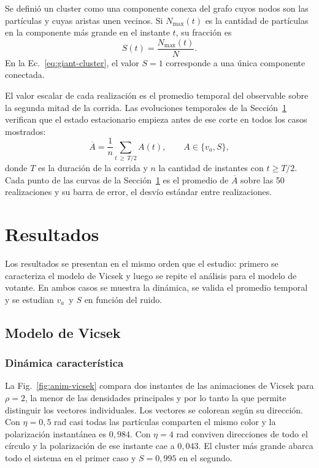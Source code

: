 \documentclass[11pt,a4paper]{article}
\newcommand{\va}{\ensuremath{v_{a}}}
\begin{document}
Se definió un cluster como una componente conexa del grafo cuyos nodos son las
partículas y cuyas aristas unen vecinos. Si $N_{\max}(t)$ es la cantidad de
partículas en la componente más grande en el instante $t$, su fracción es
\begin{equation}
    S(t) = \frac{N_{\max}(t)}{N}.
    \label{eq:giant-cluster}
\end{equation}
En la Ec.~\eqref{eq:giant-cluster}, el valor $S=1$ corresponde a una única
componente conectada.

El valor escalar de cada realización es el promedio temporal del observable
sobre la segunda mitad de la corrida. Las evoluciones temporales de la
Sección~\ref{sec:resultados} verifican que el estado estacionario empieza
antes de ese corte en todos los casos mostrados:
\begin{equation}
    \overline{A} = \frac{1}{n}\sum_{t\,\geq\,T/2} A(t),
    \qquad A\in\{\va,S\},
    \label{eq:stationary-average}
\end{equation}
donde $T$ es la duración de la corrida y $n$ la cantidad de instantes con
$t\geq T/2$. Cada punto de las curvas de la Sección~\ref{sec:resultados} es
el promedio de $\overline{A}$ sobre las 50 realizaciones y su barra de error,
el desvío estándar entre realizaciones.

\section{Resultados}
\label{sec:resultados}

Los resultados se presentan en el mismo orden que el estudio: primero se
caracteriza el modelo de Vicsek y luego se repite el análisis para el modelo de
votante. En ambos casos se muestra la dinámica, se valida el promedio temporal
y se estudian \va\ y $S$ en función del ruido.

\subsection{Modelo de Vicsek}

\subsubsection{Dinámica característica}

La Fig.~\ref{fig:anim-vicsek} compara dos instantes de las animaciones de
Vicsek para $\rho=2$, la menor de las densidades principales y por lo tanto la
que permite distinguir los vectores individuales. Los vectores se colorean
según su dirección. Con $\eta=0{,}5$ rad casi todas las partículas comparten
el mismo color y la polarización instantánea es $0{,}984$. Con $\eta=4$ rad
conviven direcciones de todo el círculo y la polarización de ese instante cae
a $0{,}043$. El cluster más grande abarca todo el sistema en el primer caso
y $S=0{,}995$ en el segundo.
\end{document}
